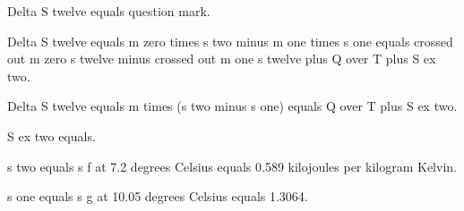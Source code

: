 Delta S twelve equals question mark.

Delta S twelve equals m zero times s two minus m one times s one equals crossed out m zero s twelve minus crossed out m one s twelve plus Q over T plus S ex two.

Delta S twelve equals m times (s two minus s one) equals Q over T plus S ex two.

S ex two equals.

s two equals s f at 7.2 degrees Celsius equals 0.589 kilojoules per kilogram Kelvin.

s one equals s g at 10.05 degrees Celsius equals 1.3064.